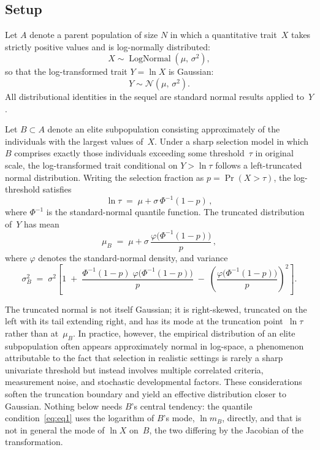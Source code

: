 \documentclass{article}
\begin{document}
\subsection{Setup}\label{ssec:setup}

Let $A$ denote a parent population of size $N$ in which a quantitative
trait~$X$ takes strictly positive values and is log-normally distributed:
\begin{equation}\label{eq:parent}
  X \sim \operatorname{LogNormal}(\mu,\,\sigma^{2}),
\end{equation}
so that the log-transformed trait $Y = \ln X$ is Gaussian:
\begin{equation}\label{eq:logtrait}
  Y \sim \mathcal{N}(\mu,\,\sigma^{2}).
\end{equation}
All distributional identities in the sequel are standard normal results
applied to~$Y$.

Let $B \subset A$ denote an elite subpopulation consisting approximately of
the individuals with the largest values of~$X$. Under a sharp selection
model in which $B$ comprises exactly those individuals exceeding some
threshold~$\tau$ in original scale, the log-transformed trait conditional on
$Y > \ln\tau$ follows a left-truncated normal distribution. Writing the
selection fraction as $p = \Pr(X > \tau)$, the log-threshold satisfies
\begin{equation}\label{eq:threshold}
  \ln\tau \;=\; \mu + \sigma\,\Phi^{-1}(1-p)\,,
\end{equation}
where $\Phi^{-1}$ is the standard-normal quantile function. The truncated
distribution of~$Y$ has mean
\begin{equation}\label{eq:trunc-mean}
  \mu_B
  \;=\;
  \mu + \sigma\,\frac{\varphi\!\bigl(\Phi^{-1}(1-p)\bigr)}{p}\,,
\end{equation}
where $\varphi$ denotes the standard-normal density, and variance
\begin{equation}\label{eq:trunc-var}
  \sigma_B^{2}
  \;=\;
  \sigma^{2}\!\left[
    1
    \;+\;
    \frac{\Phi^{-1}(1-p)\;\varphi\!\bigl(\Phi^{-1}(1-p)\bigr)}{p}
    \;-\;
    \left(\frac{\varphi\!\bigl(\Phi^{-1}(1-p)\bigr)}{p}\right)^{\!2}
  \right].
\end{equation}

The truncated normal is not itself Gaussian; it is right-skewed, truncated on the left with its tail extending right, and has its mode at the truncation point~$\ln\tau$ rather than at~$\mu_B$. In practice, however, the empirical distribution of an elite
subpopulation often appears approximately normal in log-space, a phenomenon
attributable to the fact that selection in realistic settings is rarely a
sharp univariate threshold but instead involves multiple correlated criteria,
measurement noise, and stochastic developmental factors. These
considerations soften the truncation boundary and yield an effective
distribution closer to Gaussian. Nothing below needs $B$'s central tendency: the quantile condition~\eqref{eq:eq1} uses the logarithm of $B$'s mode, $\ln m_B$, directly, and that is not in general the mode of $\ln X$ on~$B$, the two differing by the Jacobian of the transformation.
\end{document}

